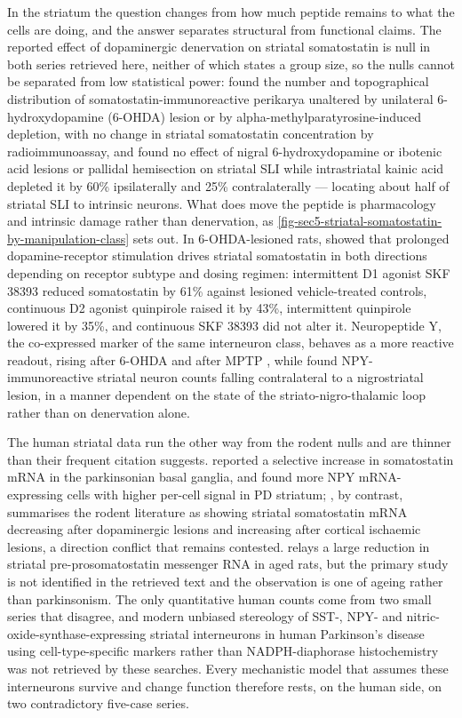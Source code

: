 \documentclass[11pt]{article}
\begin{document}
In the striatum the question changes from how much peptide remains to what the cells are doing, and the answer separates structural from functional claims. The reported effect of dopaminergic denervation on striatal somatostatin is null in both series retrieved here, neither of which states a group size, so the nulls cannot be separated from low statistical power: \citet{Salin1990} found the number and topographical distribution of somatostatin-immunoreactive perikarya unaltered by unilateral 6-hydroxydopamine (6-OHDA) lesion or by alpha-methylparatyrosine-induced depletion, with no change in striatal somatostatin concentration by radioimmunoassay, and \citet{FlintBeal1983} found no effect of nigral 6-hydroxydopamine or ibotenic acid lesions or pallidal hemisection on striatal SLI while intrastriatal kainic acid depleted it by 60\% ipsilaterally and 25\% contralaterally --- locating about half of striatal SLI to intrinsic neurons. What does move the peptide is pharmacology and intrinsic damage rather than denervation, as \ref{fig-sec5-striatal-somatostatin-by-manipulation-class} sets out. In 6-OHDA-lesioned rats, \citet{Engber1992} showed that prolonged dopamine-receptor stimulation drives striatal somatostatin in both directions depending on receptor subtype and dosing regimen: intermittent D1 agonist SKF 38393 reduced somatostatin by 61\% against lesioned vehicle-treated controls, continuous D2 agonist quinpirole raised it by 43\%, intermittent quinpirole lowered it by 35\%, and continuous SKF 38393 did not alter it. Neuropeptide Y, the co-expressed marker of the same interneuron class, behaves as a more reactive readout, rising after 6-OHDA \citep{Lei2016,Maeda1993} and after MPTP \citep{Obuchowicz2003}, while \citet{Nitsch1993} found NPY-immunoreactive striatal neuron counts falling contralateral to a nigrostriatal lesion, in a manner dependent on the state of the striato-nigro-thalamic loop rather than on denervation alone.

The human striatal data run the other way from the rodent nulls and are thinner than their frequent citation suggests. \citet{Eve1997} reported a selective increase in somatostatin mRNA in the parkinsonian basal ganglia, and \citet{Cannizzaro2003} found more NPY mRNA-expressing cells with higher per-cell signal in PD striatum; \citet{Chesselet2007}, by contrast, summarises the rodent literature as showing striatal somatostatin mRNA decreasing after dopaminergic lesions and increasing after cortical ischaemic lesions, a direction conflict that remains contested. \citet{Kasprzak2026} relays a large reduction in striatal pre-prosomatostatin messenger RNA in aged rats, but the primary study is not identified in the retrieved text and the observation is one of ageing rather than parkinsonism. The only quantitative human counts come from two small series that disagree, and modern unbiased stereology of SST-, NPY- and nitric-oxide-synthase-expressing striatal interneurons in human Parkinson's disease using cell-type-specific markers rather than NADPH-diaphorase histochemistry was not retrieved by these searches. Every mechanistic model that assumes these interneurons survive and change function therefore rests, on the human side, on two contradictory five-case series.
\end{document}
